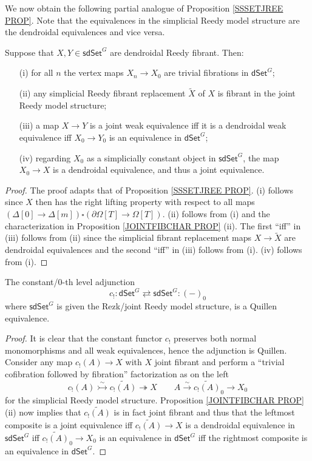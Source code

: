 \documentclass[a4paper,10pt
 ,draft
]{article}%
\begin{document}
We now obtain the following partial analogue of Proposition \ref{SSSETJREE PROP}. Note that the equivalences in the simplicial Reedy model structure are the dendroidal equivalences and vice versa.


\begin{corollary}\label{SDSETG COR}
	Suppose that $X, Y \in \mathsf{sdSet}^G$ are dendroidal Reedy fibrant. Then:
\begin{itemize}
	\item[(i)] for all $n$ the vertex maps $X_{n} \to X_{0}$ are trivial fibrations in $\mathsf{dSet}^G$;
	\item[(ii)] any simplicial Reedy fibrant replacement $\tilde{X}$ of $X$ is fibrant in the joint Reedy model structure;
	\item[(iii)] a map $X \to Y$ is a joint weak equivalence
	iff it is a dendroidal weak equivalence iff 
	$X_0 \to Y_0$ is an equivalence in $\mathsf{dSet}^G$;
	\item[(iv)] regarding $X_0$ as a simplicially constant object in $\mathsf{sdSet}^G$, the map $X_0 \to X$ is a dendroidal equivalence, and thus a joint equivalence. 
\end{itemize}
\end{corollary}

\begin{proof}
	The proof adapts that of Proposition \ref{SSSETJREE PROP}.
	(i) follows since $X$ then has the right lifting property with respect to all maps 
	$(\Delta[0] \to \Delta[m]) \square (\partial \Omega[T] \to \Omega[T])$. (ii) follows from (i) and the characterization in  Proposition \ref{JOINTFIBCHAR PROP} (ii). The first ``iff'' in (iii) follows from (ii) since the simplicial fibrant replacement maps 
	$X \to \tilde{X}$ are dendroidal equivalences
	and the second ``iff'' in (iii) follows from (i).
	(iv) follows from (i).
\end{proof}

\begin{theorem}\label{INC0AGJ THM}
	The constant/$0$-th level adjunction
	\[
	c_!\colon 
	\mathsf{dSet}^G \rightleftarrows \mathsf{sdSet}^G
	\colon (-)_0
	\]
	where $\mathsf{sdSet}^G$ is given the Rezk/joint Reedy model structure,
	is a Quillen equivalence.
\end{theorem}

\begin{proof}
	It is clear that the constant functor $c_!$ preserves both normal monomorphisms and all weak equivalences, hence the adjunction is Quillen. 
	Consider any map $c_!(A) \to X$ with $X$ joint fibrant and perform a ``trivial cofibration followed by fibration'' factorization as on the left
\[
c_!(A) \overset{\sim}{\rightarrowtail} \widetilde{c_!(A)} \twoheadrightarrow X
	\qquad
A \xrightarrow{\sim} \widetilde{c_!(A)}_0 \to X_0
\]
	for the simplicial Reedy model structure. 
	Proposition \ref{JOINTFIBCHAR PROP}(ii) now implies that 
	$\widetilde{c_!(A)}$ is in fact joint fibrant
	and thus that the leftmost composite is a joint equivalence iff $\widetilde{c_!(A)} \to X$ is a dendroidal equivalence in $\mathsf{sdSet}^G$ iff $\widetilde{c_!(A)}_0 \to X_0$ is an equivalence in  $\mathsf{dSet}^G$ iff the rightmost composite is an equivalence in $\mathsf{dSet}^G$.
\end{proof}
\end{document}
